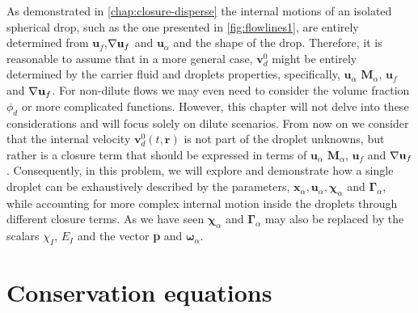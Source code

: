 As demonstrated in \ref{chap:closure-disperse} the internal motions of an isolated spherical drop, such as the one presented in  \ref{fig:flowlines1}, are entirely determined  from $\textbf{u}_f$,$\mathbf{\nabla}\textbf{u}_f$ and $\textbf{u}_\alpha$ and the shape of the drop. 
Therefore, it is reasonable to assume that in a more general case, $\textbf{v}_d^0$ might be entirely determined by the carrier fluid and droplets properties, specifically, $\textbf{u}_\alpha$ $\textbf{M}_\alpha$, $\textbf{u}_f$ and $\mathbf{\nabla}\textbf{u}_f$. 
For non-dilute flows we may even need to consider the volume fraction $\phi_d$ or more complicated functions.
However, this chapter will not delve into these considerations and will focus solely on dilute scenarios.
From now on we consider that the internal velocity $\textbf{v}^0_d(t,\textbf{r})$ is not part of the droplet unknowns, but rather is a closure term that should be expressed in terms of $\textbf{u}_\alpha$ $\textbf{M}_\alpha$, $\textbf{u}_f$ and $\mathbf{\nabla}\textbf{u}_f$. 
Consequently, in this problem, we will explore and demonstrate how a single droplet can be exhaustively described by the parameters, $\textbf{x}_\alpha, \textbf{u}_\alpha, \bm\chi_\alpha$ and $\bm\Gamma_\alpha$, while accounting for more complex internal motion inside the droplets through different closure terms.
As we have seen $\bm\chi_\alpha$ and $\bm\Gamma_\alpha$ may also be replaced by the scalars $\chi_I$, $E_I$ and the vector \textbf{p} and $\bm\omega_\alpha$. 

\section{Conservation equations}

